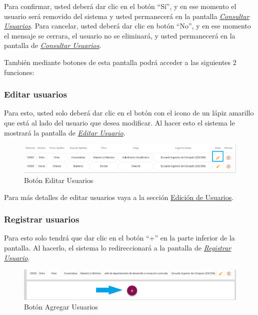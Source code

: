\begin{enumerate}
\begin{figure}[!hbtp]
                \end{figure}

                Para confirmar, usted deberá dar clic en el botón “Sí”, y en ese momento el usuario será removido del sistema y usted permanecerá en la pantalla \hyperlink{consultarUs}{\textit{Consultar Usuarios}}.
                Para cancelar, usted deberá dar clic en botón “No”, y en ese momento el mensaje se cerrara, el usuario no se eliminará, y usted permanecerá en la pantalla de \hyperlink{consultarUs}{\textit{Consultar Usuarios}}.

        \end{enumerate}

        También mediante botones de esta pantalla podrá acceder a las siguientes 2 funciones:

        \subsubsection{Editar usuarios}

            Para esto, usted solo deberá dar clic en el botón con el icono de un lápiz amarillo que está al lado del usuario que desea modificar. Al hacer esto el sistema le mostrará la pantalla   de \hyperlink{editarUs}{\textit{Editar Usuario}}.

            \begin{figure}[!hbtp]
                \centering
                \hypertarget{editar}{\includegraphics[width=0.7\linewidth]{images/SP5/BtnEditar}}
                \caption{Botón Editar Usuarios}
                \label{editar}
            \end{figure}

            Para más detalles de editar usuarios vaya a la sección \hyperlink{editar-user}{Edición de Usuarios}.

        \subsubsection{Registrar  usuarios}

            Para esto solo tendrá que dar clic en el botón “+” en la parte inferior de la pantalla. Al hacerlo, el sistema  lo redireccionará a la pantalla de \hyperlink{registrarUs}{\textit{Registrar Usuario}}.

            \begin{figure}[!hbtp]
                \centering
                \hypertarget{add}{\includegraphics[width=0.7\linewidth]{images/SP5/BtnAgregar}}
                \caption{Botón Agregar Usuarios}
                \label{add}
            \end{figure}

